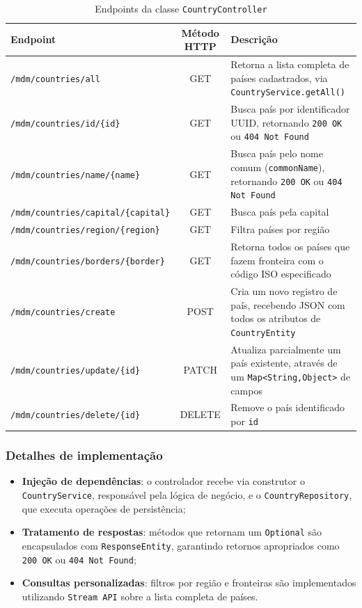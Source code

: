 \documentclass[12pt]{article}
\begin{document}
\begin{table}[H]
\centering
\caption{Endpoints da classe \texttt{CountryController}}
\begin{adjustbox}{max width=\textwidth}
\begin{tabular}{@{} l c p{8cm} @{}}
\toprule
\textbf{Endpoint} & \textbf{Método HTTP} & \textbf{Descrição} \\
\midrule
\texttt{/mdm/countries/all} & GET & Retorna a lista completa de países cadastrados, via \texttt{CountryService.getAll()} \\
\texttt{/mdm/countries/id/\{id\}} & GET & Busca país por identificador UUID, retornando \texttt{200 OK} ou \texttt{404 Not Found} \\
\texttt{/mdm/countries/name/\{name\}} & GET & Busca país pelo nome comum (\texttt{commonName}), retornando \texttt{200 OK} ou \texttt{404 Not Found} \\
\texttt{/mdm/countries/capital/\{capital\}} & GET & Busca país pela capital \\
\texttt{/mdm/countries/region/\{region\}} & GET & Filtra países por região \\
\texttt{/mdm/countries/borders/\{border\}} & GET & Retorna todos os países que fazem fronteira com o código ISO especificado \\
\texttt{/mdm/countries/create} & POST & Cria um novo registro de país, recebendo JSON com todos os atributos de \texttt{CountryEntity} \\
\texttt{/mdm/countries/update/\{id\}} & PATCH & Atualiza parcialmente um país existente, através de um \texttt{Map<String,Object>} de campos \\
\texttt{/mdm/countries/delete/\{id\}} & DELETE & Remove o país identificado por \texttt{id} \\
\bottomrule
\end{tabular}
\end{adjustbox}
\end{table}

\subsubsection{Detalhes de implementação}
\begin{itemize}
    \item \textbf{Injeção de dependências}: o controlador recebe via construtor o \texttt{CountryService}, responsável pela lógica de negócio, e o \texttt{CountryRepository}, que executa operações de persistência;
    
    \item \textbf{Tratamento de respostas}: métodos que retornam um \texttt{Optional} são encapsulados com \texttt{ResponseEntity}, garantindo retornos apropriados como \texttt{200 OK} ou \texttt{404 Not Found};
    
    \item \textbf{Consultas personalizadas}: filtros por região e fronteiras são implementados utilizando \texttt{Stream API} sobre a lista completa de países.
\end{itemize}
\end{document}
